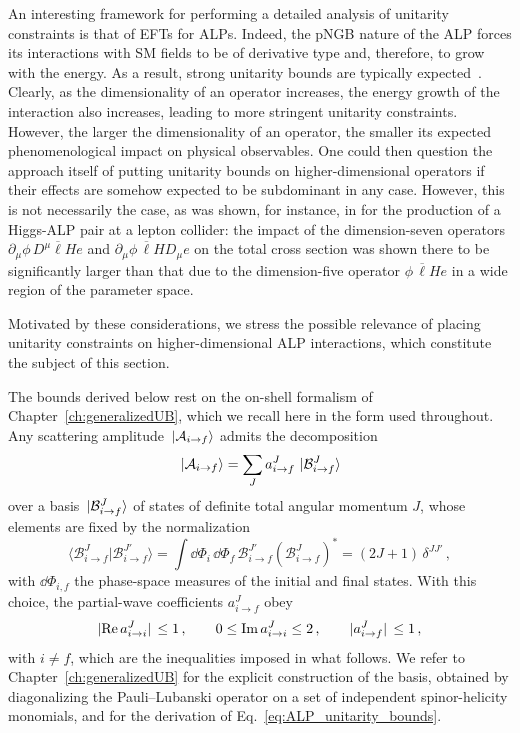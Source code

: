 An interesting framework for performing a detailed analysis of unitarity constraints is that of EFTs for ALPs. 
Indeed, the pNGB nature of the ALP forces its interactions with SM fields to be of derivative type and, therefore, to grow with the energy.
As a result, strong unitarity bounds are typically expected~\cite{Brivio:2021fog}.
Clearly, as the dimensionality of an operator increases, the energy growth of the interaction also increases, leading to more stringent unitarity constraints.
However, the larger the dimensionality of an operator, the smaller its expected phenomenological impact on physical observables. 
One could then question the approach itself of putting unitarity bounds on higher-dimensional operators if their effects are somehow expected to be subdominant in any case.
However, this is not necessarily the case, as was shown, for instance, in \cite{Bertuzzo:2023slg} for the production of a Higgs-ALP pair at a lepton collider: the impact of the dimension-seven operators $\partial_\mu \phi \,D^\mu \overline \ell H e$ and $\partial_\mu \phi \,\overline \ell H D_\mu e$ on the total cross section was shown there to be significantly larger than that due to the dimension-five operator $\phi \,\overline{\ell} H e$ in a wide region of the parameter space.

Motivated by these considerations, we stress the possible relevance of placing unitarity constraints on higher-dimensional ALP interactions, which constitute the subject of this section. 

The bounds derived below rest on the on-shell formalism of Chapter~\ref{ch:generalizedUB}, which we
recall here in the form used throughout. Any scattering amplitude $\ket*{\mathcal A_{i\to f}}$
admits the decomposition
\begin{equation}\label{eq:ALP_pwd}
    \ket*{\mathcal A_{i\to f}} = \sum_J a^J_{i\to f}\,\ket*{\mathcal B^J_{i\to f}}
\end{equation}
over a basis $\ket*{\mathcal B^J_{i\to f}}$ of states of definite total angular momentum $J$, whose
elements are fixed by the normalization
\begin{equation}\label{eq:ALP_norm}
    \langle \mathcal B^J_{i\to f}|\mathcal B^{J'}_{i\to f}\rangle = \int \dd\Phi_i \,\dd\Phi_f \, \mathcal B^{J'}_{i\to f} \left(\mathcal B^J_{i\to f}\right)^* = (2J+1)\,\delta^{JJ'}\,,
\end{equation}
with $\dd\Phi_{i,f}$ the phase-space measures of the initial and final states. With this choice, the
partial-wave coefficients $a^J_{i\to f}$ obey
\begin{equation}\label{eq:ALP_unitarity_bounds}
    \abs*{\Re a^J_{i\to i}}\le 1\,,\qquad
    0\le \Im a^J_{i\to i}\le 2\,,\qquad
    \abs*{a^J_{i\to f}}\le 1\,,
\end{equation}
with $i\neq f$,
which are the inequalities imposed in what follows. We refer to
Chapter~\ref{ch:generalizedUB} for the explicit construction of the basis, obtained by diagonalizing
the Pauli--Lubanski operator on a set of independent spinor-helicity monomials, and for the
derivation of Eq.~\eqref{eq:ALP_unitarity_bounds}.


